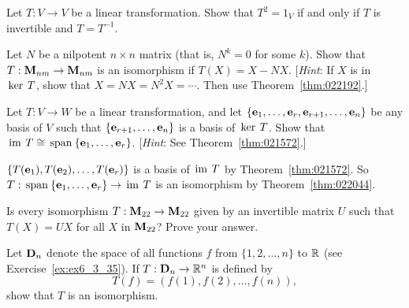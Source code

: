 \begin{multicols}{2}
\begin{ex}
\begin{sol}
\begin{enumerate}[label={\alph*.}]
\end{enumerate}
\end{sol}
\end{ex}

\begin{ex}
Let $T : V \to V$ be a linear transformation. Show that $T^{2} = 1_{V}$ if and only if $T$ is invertible and $T = T^{-1}$.
\end{ex}

\begin{ex}
Let $N$ be a nilpotent $n \times n$ matrix (that is, $N^{k} = 0$ for some $k$). Show that $T : \textbf{M}_{nm} \to \textbf{M}_{nm}$ is an isomorphism if $T(X) = X - NX$. [\textit{Hint}: If $X$ is in $\thinspace\operatorname{ker \medspace}T$, show that $X = NX = N^{2}X = \cdots$. Then use Theorem~\ref{thm:022192}.]
\end{ex}

\begin{ex}
Let $T : V \to W$ be a linear transformation, and let $\{\textbf{e}_{1}, \dots, \textbf{e}_{r}, \textbf{e}_{r+1}, \dots, \textbf{e}_{n}\}$ be any basis of $V$ such that $\{\textbf{e}_{r+1}, \dots, \textbf{e}_{n}\}$ is a basis of $\thinspace\operatorname{ker \medspace}T$. Show that $\thinspace\operatorname{im \medspace}T \cong \thinspace\operatorname{span\medspace}\{\textbf{e}_{1}, \dots, \textbf{e}_{r}\}$. [\textit{Hint}: See Theorem~\ref{thm:021572}.]

\begin{sol}
$\{T(\textbf{e}_{1}), T(\textbf{e}_{2}), \dots, T(\textbf{e}_{r})\}$ is a basis of $\thinspace\operatorname{im \medspace}T$ by Theorem~\ref{thm:021572}. So $T : \thinspace\operatorname{span\medspace}\{\textbf{e}_{1}, \dots, \textbf{e}_{r}\} \to \thinspace\operatorname{im \medspace}T$ is an isomorphism by Theorem~\ref{thm:022044}.
\end{sol}
\end{ex}

\begin{ex}
Is every isomorphism $T : \textbf{M}_{22} \to \textbf{M}_{22}$ given by an invertible matrix $U$ such that $T(X) = UX$ for all $X$ in $\textbf{M}_{22}$? Prove your answer.
\end{ex}

\begin{ex}
Let $\textbf{D}_{n}$ denote the space of all functions $f$ from $\{1, 2, \dots, n\}$ to $\mathbb{R}$ (see Exercise~\ref{ex:ex6_3_35}). If $T : \textbf{D}_{n} \to \mathbb{R}^n$ is defined by
\begin{equation*}
T(f) = (f(1), f(2), \dots, f(n)),
\end{equation*}
show that $T$ is an isomorphism.
\end{ex}


\end{multicols}
